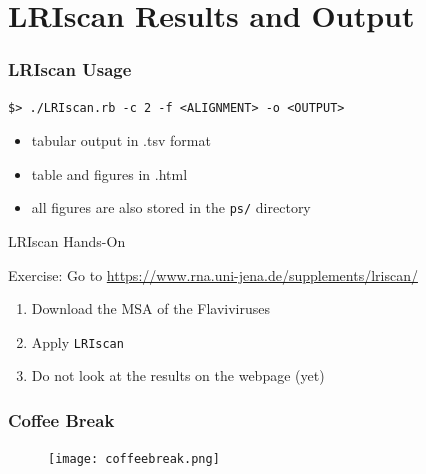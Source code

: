 \section[Results]{LRIscan Results and Output}

\begin{frame}[c, fragile]\frametitle{LRIscan Usage}
	\begin{lstlisting}
$> ./LRIscan.rb -c 2 -f <ALIGNMENT> -o <OUTPUT>
	\end{lstlisting}

\begin{itemize}
	\item tabular output in .tsv format
	\item table and figures in .html
	\item all figures are also stored in the \texttt{ps/} directory
\end{itemize}
\end{frame}

\begin{frame}[c,fragile]{LRIscan Hands-On}
  \begin{block}{Exercise:}
    Go to \url{https://www.rna.uni-jena.de/supplements/lriscan/}\\
    \begin{enumerate}
      \item Download the MSA of the Flaviviruses
      \item Apply \texttt{LRIscan}
      \item Do not look at the results on the webpage (yet)
    \end{enumerate}
  \end{block}

\end{frame}

\beginbackup

\begin{frame}[c]\frametitle{Coffee Break}
  \begin{figure}[htbp]
    \centering
    \texttt{[image: coffeebreak.png]}
  \end{figure}
\end{frame}

\backupend

